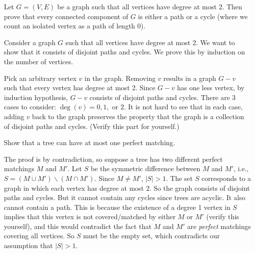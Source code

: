 \begin{flex}
\begin{exercise} \label{exercise:Graphs-with-max-degree-at-most-2}
Let $G = (V,E)$ be a graph such that all vertices have degree at most $2$. Then prove that every connected component of $G$ is either a path or a cycle (where we count an isolated vertex as a path of length 0).
\end{exercise}

\begin{solution}
Consider a graph $G$ such that all vertices have degree at most 2. We want to show that it consists of disjoint paths and cycles. We prove this by induction on the number of vertices. 

Pick an arbitrary vertex $v$ in the graph. Removing $v$ results in a graph $G-v$ such that every vertex has degree at most 2. Since $G-v$ has one less vertex, by induction hypothesis, $G-v$ consists of disjoint paths and cycles. There are 3 cases to consider: $\deg(v) = 0, 1,$ or $2$. It is not hard to see that in each case, adding $v$ back to the graph preserves the property that the graph is a collection of disjoint paths and cycles. (Verify this part for yourself.)
\end{solution}
\end{flex}


\begin{flex}
\begin{exercise} \label{exercise:A-tree-can-have-at-most-one-perfect-matching}
Show that a tree can have at most one perfect matching.
\end{exercise}

\begin{solution}
The proof is by contradiction, so suppose a tree has two different perfect matchings $M$ and $M'$. Let $S$ be the symmetric difference between $M$ and $M'$, i.e., $S = (M \cup M') \backslash (M \cap M')$. Since $M \neq M'$, $|S| > 1$. The set $S$ corresponds to a graph in which each vertex has degree at most $2$. So the graph consists of disjoint paths and cycles. But it cannot contain any cycles since trees are acyclic. It also cannot contain a path. This is because the existence of a degree 1 vertex in $S$ implies that this vertex is not covered/matched by either $M$ or $M'$ (verify this yourself), and this would contradict the fact that $M$ and $M'$ are \emph{perfect} matchings covering all vertices. So $S$ must be the empty set, which contradicts our assumption that $|S| > 1$.
\end{solution}
\end{flex}


